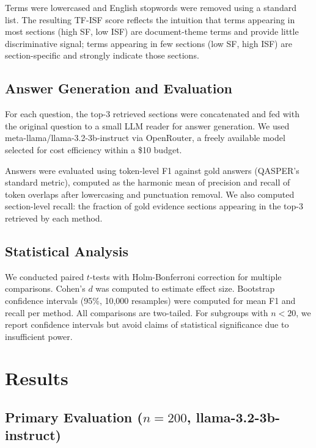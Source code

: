 \documentclass[11pt,letterpaper]{article}
\begin{document}
Terms were lowercased and English stopwords were removed using a standard list.
The resulting TF-ISF score reflects the intuition that terms appearing in most
sections (high SF, low ISF) are document-theme terms and provide little
discriminative signal; terms appearing in few sections (low SF, high ISF) are
section-specific and strongly indicate those sections.

\subsection{Answer Generation and Evaluation}

For each question, the top-3 retrieved sections were concatenated and fed with the
original question to a small LLM reader for answer generation. We used
meta-llama/llama-3.2-3b-instruct via OpenRouter, a freely available model
selected for cost efficiency within a \$10 budget.

Answers were evaluated using token-level F1 against gold answers (QASPER's
standard metric), computed as the harmonic mean of precision and recall of token
overlaps after lowercasing and punctuation removal. We also computed section-level
recall: the fraction of gold evidence sections appearing in the top-3 retrieved by
each method.

\subsection{Statistical Analysis}

We conducted paired $t$-tests with Holm-Bonferroni correction for multiple
comparisons. Cohen's $d$ was computed to estimate effect size. Bootstrap
confidence intervals (95\%, 10,000 resamples) were computed for mean F1 and recall
per method. All comparisons are two-tailed. For subgroups with $n < 20$, we
report confidence intervals but avoid claims of statistical significance due to
insufficient power.

\section{Results}

\subsection{Primary Evaluation ($n{=}200$, llama-3.2-3b-instruct)}
\end{document}
